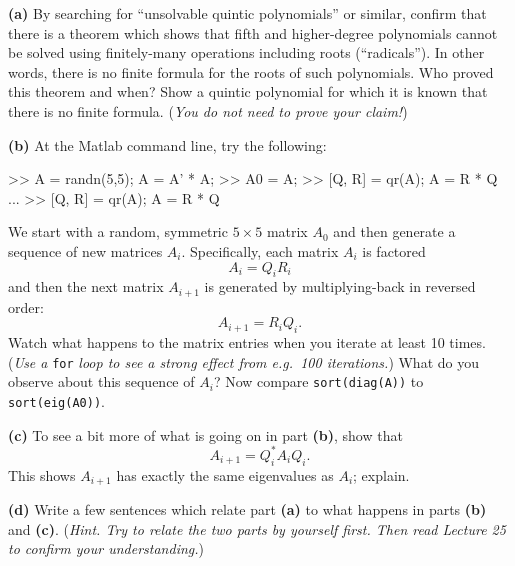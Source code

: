 \documentclass[12pt]{amsart}
\newcommand{\epart}[1]{\medskip\noindent\textbf{(#1)}\quad }
\begin{document}
\epart{a} By searching for ``unsolvable quintic polynomials'' or similar, confirm that there is a theorem which shows that fifth and higher-degree polynomials cannot be solved using finitely-many operations including roots (``radicals'').  In other words, there is no finite formula for the roots of such polynomials.  Who proved this theorem and when?  Show a quintic polynomial for which it is known that there is no finite formula.  (\emph{You do \emph{not} need to prove your claim!})

\clearpage\newpage
\epart{b} At the Matlab command line, try the following:
\begin{mVerb}
>> A = randn(5,5);  A = A' * A;    %
>> A0 = A;                         %
>> [Q, R] = qr(A);  A = R * Q
...                                %
>> [Q, R] = qr(A);  A = R * Q
\end{mVerb}
We start with a random, symmetric $5\times 5$ matrix $A_0$ and then generate a sequence of new matrices $A_i$.  Specifically, each matrix $A_i$ is factored
    $$A_i = Q_i R_i$$
and then the next matrix $A_{i+1}$ is generated by multiplying-back in reversed order:
    $$A_{i+1} = R_i Q_i.$$
Watch what happens to the matrix entries when you iterate at least 10 times.  (\emph{Use a} \texttt{for} \emph{loop to see a strong effect from e.g.~100 iterations.})  What do you observe about this sequence of $A_i$?  Now compare \verb|sort(diag(A))| to \verb|sort(eig(A0))|.

\epart{c} To see a bit more of what is going on in part \textbf{(b)}, show that
    $$A_{i+1} = Q_i^* A_i Q_i.$$
This shows $A_{i+1}$ has exactly the same eigenvalues as $A_i$; explain.

\epart{d} Write a few sentences which relate part \textbf{(a)} to what happens in parts \textbf{(b)} and \textbf{(c)}.  (\emph{Hint.  Try to relate the two parts by yourself first.  Then read Lecture 25 to confirm your understanding.})
\end{document}
